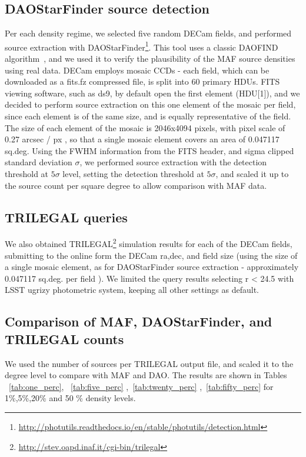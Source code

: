 \documentclass[DM,lsstdraft,toc,usenatbib]{lsstdoc}
\begin{document}
\subsection{DAOStarFinder source detection}
Per each density regime, we selected five random DECam fields, and performed source extraction with DAOStarFinder\footnote{\url{http://photutils.readthedocs.io/en/stable/photutils/detection.html}}.  This tool uses a classic DAOFIND algorithm~\citep{stetson1987}, and  we used it to verify the plausibility of the MAF source densities using real data.  DECam employs mosaic CCDs - each  field, which can be downloaded as a fits.fz compressed file, is split into 60 primary HDUs. FITS viewing software, such as ds9, by default open the first element (HDU[1]), and we decided to perform source extraction on this one element of the mosaic per field, since each element is of the same size, and is equally representative of the field. The size of each element of the mosaic is 2046x4094 pixels, with pixel scale of 0.27 arcsec / px , so that a single mosaic element covers an area of 0.047117 sq.deg. Using the FWHM information from the FITS header, and sigma clipped standard deviation $\sigma$, we performed source extraction with the detection threshold at $5 \sigma$ level, setting the detection threshold at $5\sigma$, and scaled it up to the source count per square degree to allow comparison with MAF data.  

\subsection{TRILEGAL queries}
We also  obtained TRILEGAL\footnote{\url{http://stev.oapd.inaf.it/cgi-bin/trilegal}} simulation results for each of the DECam fields, submitting to the online form the DECam ra,dec, and field size (using the size of a single mosaic element, as for DAOStarFinder source extraction -  approximately 0.047117 sq.deg. per field ). We limited the query results selecting r < 24.5 with  LSST ugrizy photometric system, keeping all other settings as default.  


\subsection{Comparison of MAF, DAOStarFinder, and TRILEGAL counts}
We used the number of sources per TRILEGAL output file, and scaled it to the degree level to compare with MAF and DAO.  The results are shown in Tables ~\ref{tab:one_perc}, ~\ref{tab:five_perc} ,~\ref{tab:twenty_perc} ,~\ref{tab:fifty_perc} for 1\%,5\%,20\% and 50 \% density levels. 
\end{document}
